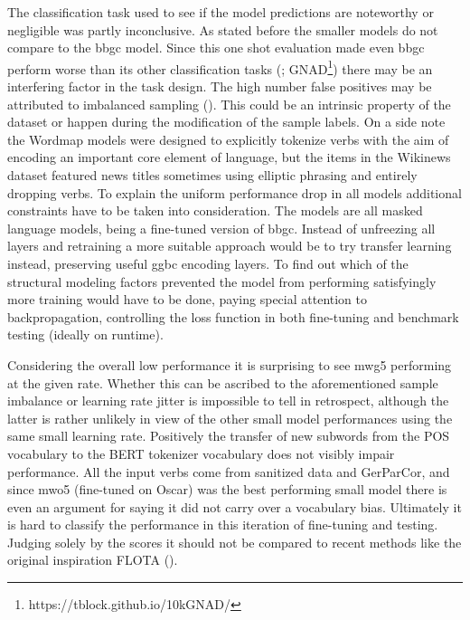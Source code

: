 The classification task used to see if the model predictions are noteworthy or negligible was partly inconclusive.
As stated before the smaller models do not compare to the bbgc model.
Since this one shot evaluation made even bbgc perform worse than its other classification tasks (\textcite{germeval}; GNAD\footnote{https://tblock.github.io/10kGNAD/}) there may be an interfering factor in the task design.
The high number false positives may be attributed to imbalanced sampling (\cite[5--6]{brownlee2020imbalanced}).
This could be an intrinsic property of the dataset or happen during the modification of the sample labels.
On a side note the Wordmap models were designed to explicitly tokenize verbs with the aim of encoding an important core element of language, but the items in the Wikinews dataset featured news titles sometimes using elliptic phrasing and entirely dropping verbs.
To explain the uniform performance drop in all models additional constraints have to be taken into consideration.
The models are all masked language models, being a fine-tuned version of bbgc.
Instead of unfreezing all layers and retraining a more suitable approach would be to try transfer learning instead, preserving useful ggbc encoding layers.
To find out which of the structural modeling factors prevented the model from performing satisfyingly more training would have to be done, paying special attention to backpropagation, controlling the loss function in both fine-tuning and benchmark testing (ideally on runtime).

Considering the overall low performance it is surprising to see mwg5 performing at the given rate.
Whether this can be ascribed to the aforementioned sample imbalance or learning rate jitter is impossible to tell in retrospect, although the latter is rather unlikely in view of the other small model performances using the same small learning rate.
Positively the transfer of new subwords from the POS vocabulary to the BERT tokenizer vocabulary does not visibly impair performance.
All the input verbs come from sanitized data and GerParCor, and since mwo5 (fine-tuned on Oscar) was the best performing small model there is even an argument for saying it did not carry over a vocabulary bias.
Ultimately it is hard to classify the performance in this iteration of fine-tuning and testing.
Judging solely by the scores it should not be compared to recent methods like the original inspiration FLOTA (\citeauthor{FLOTA}).\\



